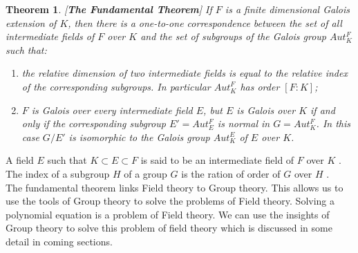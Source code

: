 \documentclass[a4paper,twoside,10pt]{article}
\theoremstyle{plain}
\newtheorem{theorem}{Theorem}[section]
\theoremstyle{definition}
\begin{document}
\begin{theorem} \cite{hunger} [\textbf{The Fundamental Theorem}]
  If \(F\) is a finite dimensional Galois extension of \(K\), then there is a one-to-one correspondence between the set of all intermediate fields of \(F\) over \(K\) and the set of subgroups of the Galois group \(Aut_K^F\) such that:
  \begin{enumerate}
  \item[i)] the relative dimension of two intermediate fields is equal to the relative index of the corresponding subgroups. In particular \(Aut_K^F\) has order \([F:K]\);
  \item[ii)] \(F\) is Galois over every intermediate field \(E\), but \(E\) is Galois over \(K\) if and only if the corresponding subgroup \(E'= Aut_E^F\) is normal in \(G=Aut_K^F\). In this case \(G/E'\) is isomorphic to the Galois group \(Aut_K^E\) of \(E\) over \(K\).
  \end{enumerate}
\end{theorem}
\vspace{2mm}
\noindent
A field \(E\) such that \(K \subset E \subset F\) is said to be an intermediate field of \(F\) over \(K\) \cite{hunger}. The index of a subgroup \(H\) of a group \(G\) is the ration of order of \(G\) over \(H\) \cite{hunger}.\\[3mm]

\noindent
The fundamental theorem links Field theory to Group theory. This allows us to use the tools of Group theory to solve the problems of Field theory. Solving a polynomial equation is a problem of Field theory. We can use the insights of Group theory to solve this problem of field theory which is discussed in some detail in coming sections.
\clearpage
\end{document}
